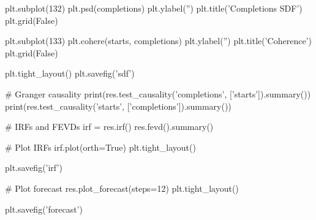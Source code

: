 \documentclass[oneside,reqno]{amsart}
\theoremstyle{definition}
\begin{document}
\begin{python3code}
plt.subplot(132)
plt.psd(completions)
plt.ylabel('')
plt.title('Completions SDF')
plt.grid(False)

plt.subplot(133)
plt.cohere(starts, completions)
plt.ylabel('')
plt.title('Coherence')
plt.grid(False)

plt.tight_layout()
plt.savefig('sdf')

# Granger causality 
print(res.test_causality('completions', ['starts']).summary())
print(res.test_causality('starts', ['completions']).summary())

# IRFs and FEVDs
irf = res.irf()
res.fevd().summary()

# Plot IRFs
irf.plot(orth=True)
plt.tight_layout()

plt.savefig('irf')

# Plot forecast
res.plot_forecast(steps=12)
plt.tight_layout()

plt.savefig('forecast')
\end{python3code}
\end{document}
